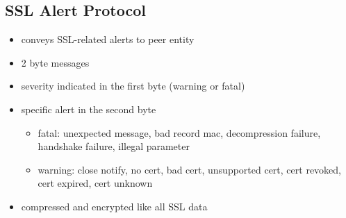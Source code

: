 \documentclass{article}
\begin{document}
\subsection{SSL Alert Protocol}
\begin{itemize}
    \item conveys SSL-related alerts to peer entity
    \item 2 byte messages
    \item severity indicated in the first byte (warning or fatal)
    \item specific alert in the second byte
    \begin{itemize}
        \item fatal: unexpected message, bad record mac, decompression failure, handshake failure, illegal parameter
        \item warning: close notify, no cert, bad cert, unsupported cert, cert revoked, cert expired, cert unknown
    \end{itemize}
    \item compressed and encrypted like all SSL data
\end{itemize}
\end{document}
